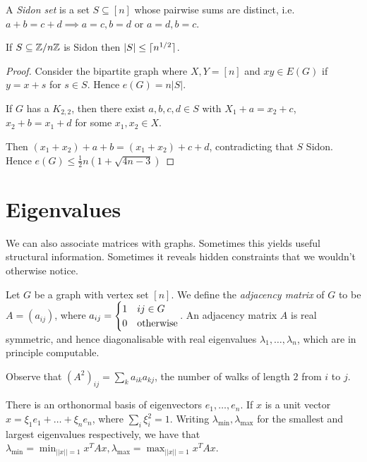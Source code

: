 \documentclass[10pt,a4paper]{article}
\begin{document}
A \emph{Sidon set} is a set $S \subseteq [n]$ whose pairwise sums are distinct, i.e. $a+b = c+d \implies a = c, b = d$ or $a=d, b=c$.

\begin{corollary}
If $S \subseteq \mathbb{Z}/n\mathbb{Z}$ is Sidon then $|S| \leq \lceil n^{1/2} \rceil$.
\end{corollary}
\begin{proof}
Consider the bipartite graph where $X,Y = [n]$ and $xy  \in E(G)$ if $y = x+s$ for $s \in S$. Hence $e(G) = n|S|$.

If $G$ has a $K_{2,2}$, then there exist $a,b,c,d \in S$ with $X_1 + a = x_2+c$, $x_2+b = x_1+d$ for some $x_1, x_2 \in X$.

Then $(x_1+ x_2) + a+b = (x_1+x_2) + c + d$, contradicting that $S$ Sidon. Hence $e(G) \leq \frac{1}{2}n (1+\sqrt{4n-3})$
\end{proof}

\section{Eigenvalues}
We can also associate matrices with graphs. Sometimes this yields useful structural information. Sometimes it reveals hidden constraints that we wouldn't otherwise notice.

Let $G$ be a graph with vertex set $[n]$. We define the \emph{adjacency matrix} of $G$ to be $A = (a_{ij})$, where $a_{ij} = \begin{cases} 1 & ij \in G \\ 0 & \text{otherwise}\end{cases}$. An adjacency matrix $A$ is real symmetric, and hence diagonalisable with real eigenvalues $\lambda_1, \ldots, \lambda_n$, which are in principle computable.

Observe that $(A^2)_{ij} = \sum_k a_{ik} a_{kj}$, the number of walks of length $2$ from $i$ to $j$.

There is an orthonormal basis of eigenvectors $e_1, \ldots, e_n$. If $x$ is a unit vector $x = \xi_1 e_1 + \ldots + \xi_n e_n$, where $\sum_i \xi_i^2 = 1$. Writing $\lambda_{\min}, \lambda_{\max}$ for the smallest and largest eigenvalues respectively, we have that $\lambda_{\min} = \min_{||x||=1}x^T Ax, \lambda_{\max} = \max_{||x||=1}x^T Ax$.
\end{document}
